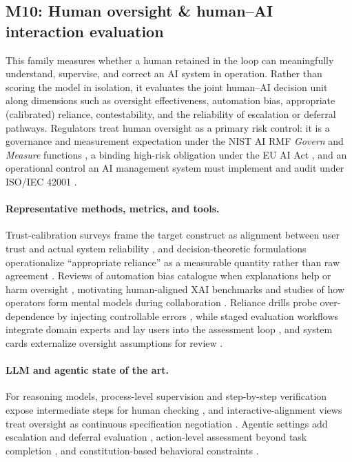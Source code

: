 \subsection{M10: Human oversight \& human--AI interaction evaluation}
\label{subsec:m10}

This family measures whether a human retained in the loop can meaningfully understand, supervise, and correct an AI system in operation. Rather than scoring the model in isolation, it evaluates the joint human--AI decision unit along dimensions such as oversight effectiveness, automation bias, appropriate (calibrated) reliance, contestability, and the reliability of escalation or deferral pathways. Regulators treat human oversight as a primary risk control: it is a governance and measurement expectation under the NIST AI RMF \textit{Govern} and \textit{Measure} functions \cite{nist2023airmf}, a binding high-risk obligation under the EU AI Act \cite{euaiact2024}, and an operational control an AI management system must implement and audit under ISO/IEC 42001 \cite{iso42001}.

\paragraph{Representative methods, metrics, and tools.} Trust-calibration surveys frame the target construct as alignment between user trust and actual system reliability \cite{amershi2022trustcalibration}, and decision-theoretic formulations operationalize ``appropriate reliance'' as a measurable quantity rather than raw agreement \cite{guo2024reliance}. Reviews of automation bias catalogue when explanations help or harm oversight \cite{romeo2025automationbias}, motivating human-aligned XAI benchmarks \cite{wang2024xaibenchmark} and studies of how operators form mental models during collaboration \cite{wang2025mentalmodels}. Reliance drills probe over-dependence by injecting controllable errors \cite{chen2024reliancedrills}, while staged evaluation workflows integrate domain experts and lay users into the assessment loop \cite{liang2024stagedworkflows}, and system cards externalize oversight assumptions for review \cite{reddy2025systemcards}.

\paragraph{LLM and agentic state of the art.} For reasoning models, process-level supervision and step-by-step verification expose intermediate steps for human checking \cite{wang2023verifystepbystep,hou2025processrewardsurvey}, and interactive-alignment views treat oversight as continuous specification negotiation \cite{krause2023interactivealignment}. Agentic settings add escalation and deferral evaluation \cite{cui2024escalation}, action-level assessment beyond task completion \cite{tan2024agentassessment}, and constitution-based behavioral constraints \cite{tan2025constitutionalai}.

